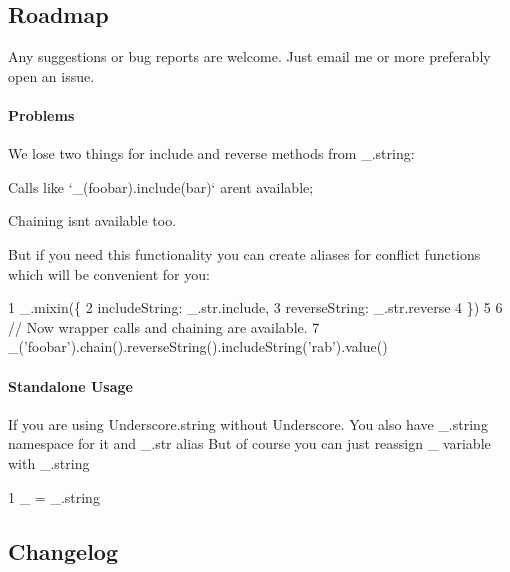 \subsection*{Roadmap}

Any suggestions or bug reports are welcome. Just email me or more preferably open an issue.

\paragraph*{Problems}

We lose two things for {\ttfamily include} and {\ttfamily reverse} methods from {\ttfamily \+\_\+.\+string}\+:


\begin{DoxyItemize}
\item Calls like `\+\_\+(\textquotesingle{}foobar\textquotesingle{}).include(\textquotesingle{}bar\textquotesingle{})` aren\textquotesingle{}t available;
\item Chaining isn\textquotesingle{}t available too.
\end{DoxyItemize}

But if you need this functionality you can create aliases for conflict functions which will be convenient for you\+:


\begin{DoxyCode}
1 \_.mixin(\{
2     includeString: \_.str.include,
3     reverseString: \_.str.reverse
4 \})
5 
6 // Now wrapper calls and chaining are available.
7 \_('foobar').chain().reverseString().includeString('rab').value()
\end{DoxyCode}


\paragraph*{Standalone Usage}

If you are using Underscore.\+string without Underscore. You also have {\ttfamily \+\_\+.\+string} namespace for it and {\ttfamily \+\_\+.\+str} alias But of course you can just reassign {\ttfamily \+\_\+} variable with {\ttfamily \+\_\+.\+string}


\begin{DoxyCode}
1 \_ = \_.string
\end{DoxyCode}


\subsection*{Changelog}

